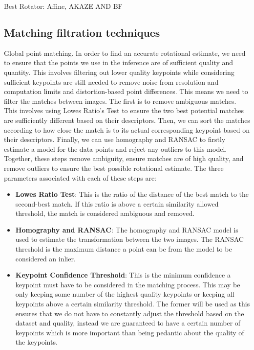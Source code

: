 Best Rotator: Affine, AKAZE AND BF




\subsection*{Matching filtration techniques}
Global point matching. In order to find an accurate rotational estimate, we need to ensure that the points we use in the inference are of sufficient quality and quantity. This involves filtering out lower quality keypoints while considering sufficient keypoints are still needed to remove noise from resolution and computation limits and distortion-based point differences. This means we need to filter the matches between images. The first is to remove ambiguous matches. This involves using Lowes Ratio's Test to ensure the two best potential matches are sufficiently different based on their descriptors. Then, we can sort the matches according to how close the match is to its actual corresponding keypoint based on their descriptors. Finally, we can use homography and RANSAC to firstly estimate a model for the data points and reject any outliers to this model. Together, these steps remove ambiguity, ensure matches are of high quality, and remove outliers to ensure the best possible rotational estimate.
The three parameters associated with each of these steps are:
\begin{itemize}
    \item \textbf{Lowes Ratio Test}: This is the ratio of the distance of the best match to the second-best match. If this ratio is above a certain similarity allowed threshold, the match is considered ambiguous and removed. 
    \item \textbf{Homography and RANSAC}: The homography and RANSAC model is used to estimate the transformation between the two images. The RANSAC threshold is the maximum distance a point can be from the model to be considered an inlier. 
    \item \textbf{Keypoint Confidence Threshold}: This is the minimum confidence a keypoint must have to be considered in the matching process. This may be only keeping some number of the highest quality keypoints or keeping all keypoints above a certain similarity threshold. The former will be used as this ensures that we do not have to constantly adjust the threshold based on the dataset and quality, instead we are guaranteed to have a certain number of keypoints which is more important than being pedantic about the quality of the keypoints.
\end{itemize}
    
